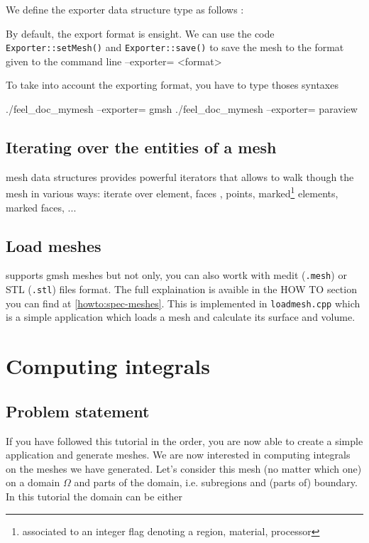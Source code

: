 We define the exporter data structure type as follows :


By default, the  export format is ensight. We can use the code \lstinline!Exporter::setMesh()! and \lstinline!Exporter::save()! to save the mesh to the format given to the command line --exporter= <format>



To take into account the exporting format, you have to type thoses syntaxes
\begin{unixcom}
		./feel_doc_mymesh  --exporter= gmsh
		./feel_doc_mymesh  --exporter= paraview
\end{unixcom}


\subsection{Iterating over the entities of a mesh}

\feel mesh data structures provides powerful iterators that allows to
walk though the mesh in various ways: iterate over element, faces ,
points, marked\footnote{associated to an integer flag denoting a
  region, material, processor} elements, marked faces, ...

\subsection{Load meshes}

\feel supports gmsh meshes but not only, you can also wortk with medit (\lstinline!.mesh!) or STL (\lstinline!.stl!) files format. The full explaination is avaible in the HOW TO section you can find at \ref{howto:spec-meshes}. This is implemented in \lstinline!loadmesh.cpp! which is a simple application which loads a mesh and calculate its surface and volume.

\section{Computing integrals}
\label{sec:computing-integrals}

\subsection{Problem statement}

If you have followed this tutorial in the order, you are now able to create a simple application and generate meshes. We are now interested in computing integrals on the meshes we have generated. Let's consider this mesh (no matter which one) on a domain $\Omega$ and parts of the domain, i.e. subregions and (parts of) boundary. In this tutorial the domain can be either

